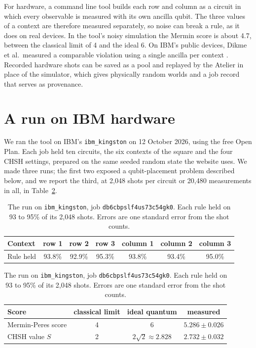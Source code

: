 \documentclass[11pt,a4paper]{article}
\theoremstyle{qresult}
\begin{document}
For hardware, a command line tool builds each row and column as a circuit in which every observable is measured with
its own ancilla qubit. The three values of a context are therefore measured separately, so noise can break a rule,
as it does on real devices. In the tool's noisy simulation the Mermin score is about 4.7, between the classical limit
of 4 and the ideal 6. On IBM's public devices, Dikme et al.\ measured a comparable violation using a single ancilla
per context \citep{dikme2020}. Recorded hardware shots can be saved as a pool and replayed by the Atelier in place
of the simulator, which gives physically random worlds and a job record that serves as provenance.

\section{A run on IBM hardware}
\label{sec:hardware}

We ran the tool on IBM's \texttt{ibm\_kingston} on 12 October 2026, using the free Open Plan. Each job held ten
circuits, the six contexts of the square and the four CHSH settings, prepared on the same seeded random state the
website uses. We made three runs; the first two exposed a qubit-placement problem described below, and we report
the third, at 2{,}048 shots per circuit or 20{,}480 measurements in all, in Table~\ref{tab:hardware}.


\begin{table}[!hb]
\centering
\small
\begin{tabular}{@{}lcccccc@{}}
\toprule
Context & row 1 & row 2 & row 3 & column 1 & column 2 & column 3 \\
\midrule
Rule held & 93.8\% & 92.9\% & 95.3\% & 93.8\% & 93.4\% & 95.0\% \\
\bottomrule
\end{tabular}

\vspace{8pt}
\begin{tabular}{@{}lccc@{}}
\toprule
Score & classical limit & ideal quantum & measured \\
\midrule
Mermin-Peres score & 4 & 6 & $5.286 \pm 0.026$ \\
CHSH value $S$ & 2 & $2\sqrt2 \approx 2.828$ & $2.732 \pm 0.032$ \\
\bottomrule
\end{tabular}
\caption{The run on \texttt{ibm\_kingston}, job \texttt{db6cbpslf4us73c54gk0}. Each rule held on 93 to 95\% of its
2{,}048 shots. Errors are one standard error from the shot counts.}
\label{tab:hardware}
\end{table}
\end{document}
